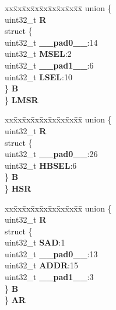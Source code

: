 \begin{DoxyCompactItemize}
\begin{tabbing}
\end{tabbing}\item 
\mbox{\label{structFLASH__tag_ae00a1d5d53eeba8cf74dbbbcb531db31}} 
\begin{tabbing}
xx\=xx\=xx\=xx\=xx\=xx\=xx\=xx\=xx\=\kill
union \{\\
\>uint32\_t {\bfseries R}\\
\>struct \{\\
\>\>uint32\_t {\bfseries \_\_pad0\_\_}:14\\
\>\>uint32\_t {\bfseries MSEL}:2\\
\>\>uint32\_t {\bfseries \_\_pad1\_\_}:6\\
\>\>uint32\_t {\bfseries LSEL}:10\\
\>\} {\bfseries B}\\
\} {\bfseries LMSR}\\

\end{tabbing}\item 
\mbox{\label{structFLASH__tag_affa47c852fe5bae01709ff89a7db6d9c}} 
\begin{tabbing}
xx\=xx\=xx\=xx\=xx\=xx\=xx\=xx\=xx\=\kill
union \{\\
\>uint32\_t {\bfseries R}\\
\>struct \{\\
\>\>uint32\_t {\bfseries \_\_pad0\_\_}:26\\
\>\>uint32\_t {\bfseries HBSEL}:6\\
\>\} {\bfseries B}\\
\} {\bfseries HSR}\\

\end{tabbing}\item 
\mbox{\label{structFLASH__tag_a328fc5ccc1fad8994764d633b211016a}} 
\begin{tabbing}
xx\=xx\=xx\=xx\=xx\=xx\=xx\=xx\=xx\=\kill
union \{\\
\>uint32\_t {\bfseries R}\\
\>struct \{\\
\>\>uint32\_t {\bfseries SAD}:1\\
\>\>uint32\_t {\bfseries \_\_pad0\_\_}:13\\
\>\>uint32\_t {\bfseries ADDR}:15\\
\>\>uint32\_t {\bfseries \_\_pad1\_\_}:3\\
\>\} {\bfseries B}\\
\} {\bfseries AR}\\


\end{tabbing}
\end{DoxyCompactItemize}

